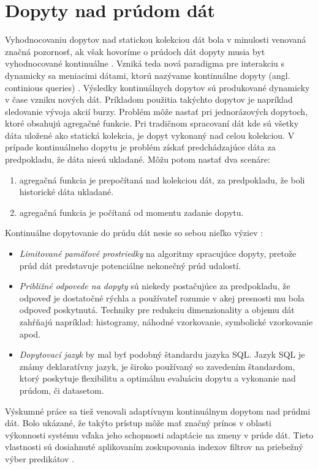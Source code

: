 \section{Dopyty nad prúdom dát}
Vyhodnocovaniu dopytov nad statickou kolekciou dát bola v minulosti venovaná značná pozornosť, ak však hovoríme o prúdoch dát dopyty musia byt vyhodnocované kontinuálne \citep{babu2001continuous, babcock2002models}. Vzniká teda nová paradigma pre interakciu s dynamicky sa meniacimi dátami, ktorú nazývame kontinuálne dopyty (angl. continious queries) \citep{babu2001continuous}. Výsledky kontinuálnych dopytov sú produkované dynamicky v čase vzniku nových dát. Príkladom použitia takýchto dopytov je napríklad sledovanie vývoja akcií burzy. Problém môže nastať pri jednorázových dopytoch, ktoré obsahujú agregačné funkcie. Pri tradičnom spracovaní dát kde sú všetky dáta uložené ako statická kolekcia, je dopyt vykonaný nad celou kolekciou. V prípade kontinuálneho dopytu je problém získať predchádzajúce dáta za predpokladu, že dáta niesú ukladané. Môžu potom nastať dva scenáre:
\begin{enumerate}
	\item agregačná funkcia je prepočítaná nad kolekciou dát, za predpokladu, že boli historické dáta ukladané.
	\item agregačná funkcia je počítaná od momentu zadanie dopytu.
\end{enumerate}
Kontinuálne dopytovanie do prúdu dát nesie so sebou nieľko výziev \citep{babcock2002models}:
\begin{itemize}
	\item \textit{Limitované pamäťové prostriedky} na algoritmy spracujúce dopyty, pretože prúd dát predstavuje potenciálne nekonečný prúd udalostí.
	\item \textit{Približné odpovede na dopyty} sú niekedy postačujúce za predpokladu, že odpoveď je dostatočné rýchla a používateľ rozumie v akej presnosti mu bola odpoveď poskytnutá. Techniky pre redukciu dimenzionality a objemu dát zahŕňajú napríklad: histogramy, náhodné vzorkovanie, symbolické vzorkovanie apod.
	\item \textit{Dopytovací jazyk} by mal byť podobný štandardu jazyka SQL. Jazyk SQL je známy deklaratívny jazyk, je široko používaný so zavedením štandardom, ktorý poskytuje flexibilitu a optimálnu evaluáciu dopytu a vykonanie nad prúdom, či datasetom. 
\end{itemize}
Výskumné práce sa tiež venovali adaptívnym kontinuálnym dopytom nad prúdmi dát. Bolo ukázané, že takýto prístup môže mať značný prínos v oblasti výkonnosti systému vďaka jeho schopnosti adaptácie na zmeny v prúde dát. Tieto vlastnosti sú dosiahnuté aplikovaním zoskupovania indexov filtrov na priebežný výber predikátov \citep{madden2002continuously}. 
